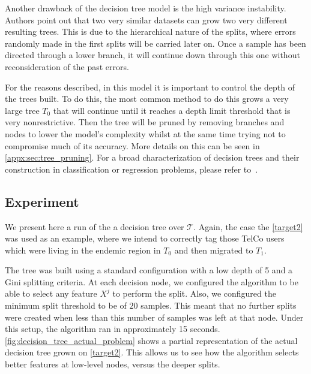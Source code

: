 Another drawback of the decision tree model is the high variance instability.
Authors point out that two very similar datasets can grow two very different resulting trees.
This is due to the hierarchical nature of the splits, where errors randomly made in the first splits will be carried later on.
Once a sample has been directed through a lower branch, it will continue down through this one without reconsideration of the past errors.

For the reasons described, in this model it is important to control the depth of the trees built.
To do this, the most common method to do this grows a very large tree $T_0$ that will continue until it reaches a depth limit threshold that is very nonrestrictive.
Then the tree will be pruned by removing branches and nodes to lower the model's complexity whilst at the same time trying not to compromise much of its accuracy.
More details on this can be seen in \cref{appx:sec:tree_pruning}.
For a broad characterization of decision trees and their construction in classification or regression problems, please refer to~\citep{breiman-cart84}.

\subsection{Experiment}\label{subsection:decision_trees_experiment}

We present here a run of the a decision tree over $\mathcal{T}$.
Again, the case the \cref{target2} was used as an example, where we intend to correctly tag those TelCo users which were living in the endemic region in $T_0$ and then migrated to $T_1$.

The tree was built using a standard configuration with a low depth of 5 and a Gini splitting criteria.
At each decision node, we configured the algorithm to be able to select any feature $X^j$ to perform the split.
Also, we configured the minimum split threshold to be of $20$ samples.
This meant that no further splits were created when less than this number of samples was left at that node.
Under this setup, the algorithm ran in approximately 15 seconds.
\cref{fig:decision_tree_actual_problem} shows a partial representation of the actual decision tree grown on \cref{target2}.
This allows us to see how the algorithm selects better features at low-level nodes, versus the deeper splits.

\bigskip

